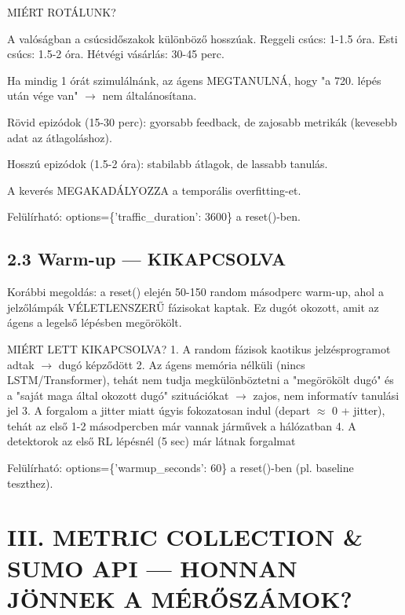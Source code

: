 \documentclass[11pt,a4paper]{article}
\begin{document}
MIÉRT ROTÁLUNK?
\par\noindent\hspace*{1em}\textbullet{} A valóságban a csúcsidőszakok különböző hosszúak.
Reggeli csúcs: 1-1.5 óra. Esti csúcs: 1.5-2 óra.
Hétvégi vásárlás: 30-45 perc.
\par\noindent\hspace*{1em}\textbullet{} Ha mindig 1 órát szimulálnánk, az ágens MEGTANULNÁ,
hogy "a 720. lépés után vége van" $\rightarrow$ nem általánosítana.
\par\noindent\hspace*{1em}\textbullet{} Rövid epizódok (15-30 perc): gyorsabb feedback, de zajosabb
metrikák (kevesebb adat az átlagoláshoz).
\par\noindent\hspace*{1em}\textbullet{} Hosszú epizódok (1.5-2 óra): stabilabb átlagok, de lassabb tanulás.
\par\noindent\hspace*{1em}\textbullet{} A keverés MEGAKADÁLYOZZA a temporális overfitting-et.

Felülírható: options=\{'traffic\_duration': 3600\} a reset()-ben.

\subsection*{2.3 Warm-up — KIKAPCSOLVA}
Korábbi megoldás: a reset() elején 50-150 random másodperc warm-up,
ahol a jelzőlámpák VÉLETLENSZERŰ fázisokat kaptak. Ez dugót okozott,
amit az ágens a legelső lépésben megörökölt.

MIÉRT LETT KIKAPCSOLVA?
1. A random fázisok kaotikus jelzésprogramot adtak $\rightarrow$ dugó képződött
2. Az ágens memória nélküli (nincs LSTM/Transformer), tehát nem tudja
megkülönböztetni a "megörökölt dugó" és a "saját maga által okozott
dugó" szituációkat $\rightarrow$ zajos, nem informatív tanulási jel
3. A forgalom a jitter miatt úgyis fokozatosan indul (depart $\approx$ 0 + jitter),
tehát az első 1-2 másodpercben már vannak járművek a hálózatban
4. A detektorok az első RL lépésnél (5 sec) már látnak forgalmat

Felülírható: options=\{'warmup\_seconds': 60\} a reset()-ben (pl. baseline teszthez).


\section*{III. METRIC COLLECTION \& SUMO API — HONNAN JÖNNEK A MÉRŐSZÁMOK?}
\end{document}
